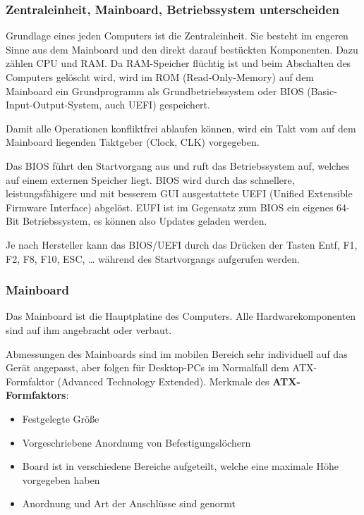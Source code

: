 \documentclass[asp1.tex]{subfiles}
\begin{document}
\subsubsection{Zentraleinheit, Mainboard, Betriebssystem unterscheiden}

Grundlage eines jeden Computers ist die Zentraleinheit. Sie besteht im engeren Sinne aus dem Mainboard und den direkt darauf bestückten Komponenten. Dazu zählen CPU und RAM.
Da RAM-Speicher flüchtig ist und beim Abschalten des Computers gelöscht wird, wird im ROM (Read-Only-Memory) auf dem Mainboard ein Grundprogramm als Grundbetriebssystem oder BIOS (Basic-Input-Output-System, auch UEFI) gespeichert.

Damit alle Operationen konfliktfrei ablaufen können, wird ein Takt vom auf dem Mainboard liegenden Taktgeber (Clock, CLK) vorgegeben.

Das BIOS führt den Startvorgang aus und ruft das Betriebssystem auf, welches auf einem externen Speicher liegt.
BIOS wird durch das schnellere, leistungsfähigere und mit besserem GUI ausgestattete UEFI (Unified Extensible Firmware Interface) abgelöst. EUFI ist im Gegensatz zum BIOS ein eigenes 64-Bit Betriebssystem, es können also Updates geladen werden.

Je nach Hersteller kann das BIOS/UEFI durch das Drücken der Tasten Entf, F1, F2, F8, F10, ESC, … während des Startvorgangs aufgerufen werden.


\subsubsection{Mainboard}

Das Mainboard ist die Hauptplatine des Computers. Alle Hardwarekomponenten sind auf ihm angebracht oder verbaut.

Abmessungen des Mainboards sind im mobilen Bereich sehr individuell auf das Gerät angepasst, aber folgen für Desktop-PCs im Normalfall dem ATX-Formfaktor (Advanced Technology Extended). Merkmale des \textbf{ATX-Formfaktors}:

\begin{itemize}
    \item Festgelegte Größe
    \item Vorgeschriebene Anordnung von Befestigungslöchern
    \item Board ist in verschiedene Bereiche aufgeteilt, welche eine maximale Höhe vorgegeben haben
    \item Anordnung und Art der Anschlüsse sind genormt
\end{itemize}
\end{document}
